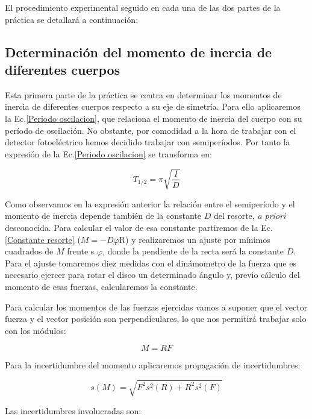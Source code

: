 \documentclass[a4paper,12pt,titlepage]{article}
\begin{document}
El procedimiento experimental seguido en cada una de las dos partes de la práctica se detallará a continuación:

\subsection{Determinación del momento de inercia de diferentes cuerpos}

Esta primera parte de la práctica se centra en determinar los momentos de inercia de diferentes cuerpos respecto a su eje de simetría. Para ello aplicaremos la Ec.\ref{Periodo oscilacion}, que relaciona el momento de inercia del cuerpo con su período de oscilación. No obstante, por comodidad a la hora de trabajar con el detector fotoeléctrico hemos decidido trabajar con semiperíodos. Por tanto la expresión de la Ec.\ref{Periodo oscilacion} se transforma en:

\begin{equation}
    T_{1/2} = \pi \sqrt{\frac{I}{D}}
    \label{SemiT osc}
\end{equation}

Como observamos en la expresión anterior la relación entre el semiperíodo y el momento de inercia depende también de la constante $D$ del resorte, \textit{a priori} desconocida. Para calcular el valor de esa constante partiremos de la Ec.\ref{Constante resorte} ($M=-D\varphi$R) y realizaremos un ajuste por mínimos cuadrados de $M$ frente s $\varphi$, donde la pendiente de la recta será la constante $D$. Para el ajuste tomaremos diez medidas con el dinámometro de la fuerza que es necesario ejercer para rotar el disco un determinado ángulo y, previo cálculo del momento de esas fuerzas, calcularemos la constante.

\par Para calcular los momentos de las fuerzas ejercidas vamos a suponer que el vector fuerza y el vector posición son perpendiculares, lo que nos permitirá trabajar solo con los módulos:

\begin{equation}
    M=RF
\end{equation}

Para la incertidumbre del momento aplicaremos propagación de incertidumbres:

\begin{equation}
    s(M) = \sqrt{F^2s^2(R)+R^2s^2(F)}
\end{equation}

Las incertidumbres involucradas son:
\end{document}
